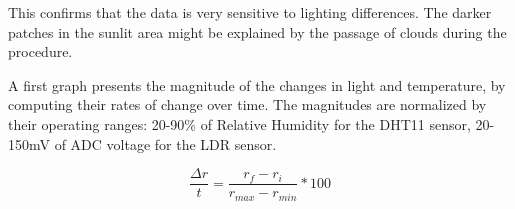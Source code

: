 
This confirms that the data is very sensitive to lighting differences. The darker patches in the sunlit area might be explained by the passage of clouds during the procedure. 

\textbf{} A first graph presents the magnitude of the changes in light and temperature, by computing their rates of change over time. The magnitudes are normalized by their operating ranges: 20-90\% of Relative Humidity for the DHT11 sensor, 20-150mV of ADC voltage for the LDR sensor.

\begin{equation}
{\frac{\Delta{r}}{{t}}} = 
{\frac{r_{f} - r_{i}}{r_{max}-r_{min}} * 100}
\end{equation}

